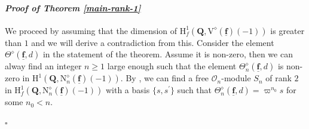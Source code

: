 \documentclass[10pt]{amsart}
\numberwithin{equation}{section}
\theoremstyle{plain}
\numberwithin{equation}{section}
\theoremstyle{definition}
\theoremstyle{remark}
\newenvironment{myproof}[2] {\paragraph{\emph{Proof of {#1} {#2} }}}{\hfill$\square$}
\def\triplef{\underline{\mathbf{f}}}
\def\calO{\mathcal{O}}
\def\QQ{\mathbf{Q}}
\def\rmH{\mathrm{H}}
\def\rmN{\mathrm{N}}
\begin{document}
\begin{myproof}{Theorem}{\ref{main-rank-1}}

We proceed by assuming that the dimension of $\rmH^{1}_{f}(\QQ, \mathrm{V}^{\diamond}(\triplef)(-1))$ is greater than $1$ and we will derive a contradiction from this. Consider the element $\Theta^{\diamond}(\triplef, d)$ in the statement of the theorem. Assume it is non-zero, then we can alway find an integer $n\geq 1$ large enough such that the element $\Theta^{\diamond}_{n}(\triplef, d)$ is non-zero in $\rmH^{1}(\QQ,  \rmN^{\diamond}_{n}(\triplef)(-1))$.  By \cite[Lemma 5.9]{Liu-HZ}, we can find a free $\calO_{n}$-module $S_{n}$ of rank $2$ in $\rmH^{1}_{f}(\QQ,  \rmN^{\diamond}_{n}(\triplef)(-1))$ with a basis $\{s, s^{\prime}\}$ such that $\Theta^{\diamond}_{n}(\triplef,d)=\varpi^{n_{0}}s$ for some $n_{0}< n$. 


\end{myproof}
\end{document}
